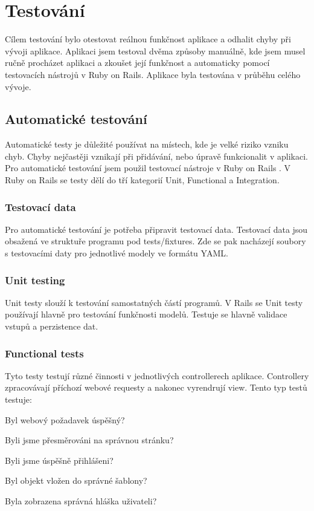 \chapter{Testování}

Cílem testování bylo otestovat reálnou funkčnost aplikace a odhalit chyby při vývoji aplikace. Aplikaci jsem testoval dvěma způsoby manuálně, kde jsem musel ručně procházet aplikaci a zkoušet její funkčnost a automaticky pomocí testovacích nástrojů v Ruby on Rails. Aplikace byla testována v průběhu celého vývoje.

\section{Automatické testování}
Automatické testy je důležité používat na místech, kde je velké riziko vzniku chyb. Chyby nejčastěji vznikají při přidávání, nebo úpravě funkcionalit v aplikaci. Pro automatické testování jsem použil testovací nástroje v Ruby on Rails \cite{RoR_testing}. V Ruby on Rails se testy dělí do tří kategorií  Unit, Functional a Integration.

\subsection{Testovací data}
Pro automatické testování je potřeba připravit testovací data. Testovací data jsou obsažená ve struktuře programu pod tests/fixtures. Zde se pak nacházejí soubory s testovacími daty pro jednotlivé modely ve formátu YAML.

\subsection{Unit testing}
Unit testy slouží k testování samostatných částí programů. V Rails se Unit testy používají hlavně pro testování funkčnosti modelů. Testuje se hlavně validace vstupů a perzistence dat.

\subsection{Functional tests}
Tyto testy testují různé činnosti v jednotlivých controllerech aplikace. Controllery zpracovávají příchozí webové requesty a nakonec vyrendrují view. Tento typ testů testuje:

\begin{list}{•}{}
\item Byl webový požadavek úspěšný?
\item Byli jsme přesměrováni na správnou stránku?
\item Byli jsme úspěšně přihlášeni?
\item Byl objekt vložen do správné šablony?
\item Byla zobrazena správná hláška uživateli?
\end{list} 

